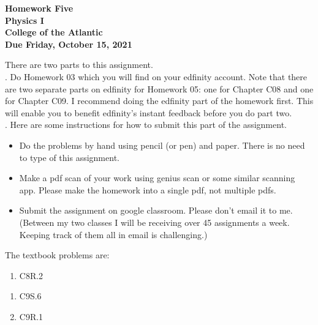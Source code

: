 \documentclass[12pt]{article}
\begin{document}
\pagestyle{empty}
 
\begin{center}
{\LARGE {\bf Homework Five}}\\
\bigskip
{\Large {\bf Physics I}}\\
\bigskip
{\Large {\bf College of the Atlantic}}\\
\bigskip
{ {\bf Due Friday, October 15, 2021}}\\ 
\end{center}
\medskip

\noindent There are two parts to this assignment.\\


.  Do Homework 03 which you will find
on your edfinity account.  Note that there are two separate parts on
edfinity for Homework 05: one for Chapter C08 and one for Chapter
C09.  I recommend doing the edfinity part of the homework first.  This
will enable you to benefit edfinity's instant feedback before you do
part two.\\ 


.  Here are some
instructions for how to submit this part of the assignment.
\begin{itemize}
\item Do the problems by hand using pencil (or pen) and paper.
  There is no need to type of this assignment.
\item Make a pdf scan of your work using genius scan or some
  similar scanning app.  Please make the homework into a single
  pdf, not multiple pdfs.
\item Submit the assignment on google classroom.  Please don't
  email it to me.  (Between my two classes I will be receiving
  over 45 assignments a week.  Keeping track of them all in email
  is challenging.)\\
\end{itemize}

\noindent The textbook problems are:\\   

  \begin{enumerate}
  \item C8R.2
  \end{enumerate}

  \begin{enumerate}
  \item C9S.6
  \item C9R.1
  \end{enumerate}
\end{document}
